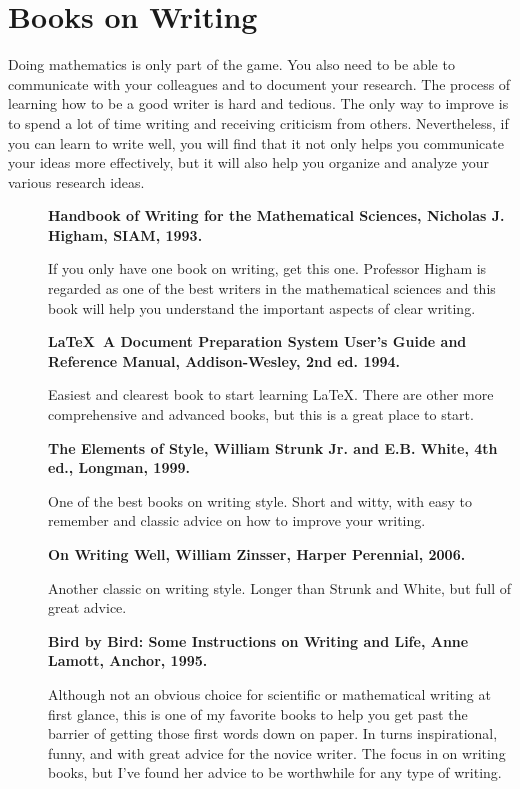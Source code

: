 \documentclass[11pt]{article}
\begin{document}
 
 \section{Books on Writing}
Doing mathematics is only part of the game.  You also need to be able to communicate with your colleagues and to document your research.  The process of learning how to be a good writer is hard and tedious.  The only way to improve is to spend a lot of time writing and receiving criticism from others.  Nevertheless, if you can learn to write well, you will find that it not only helps you communicate your ideas more effectively, but it will also help you organize and analyze your various research ideas. 
  
\begin{description}

\item[ ] {\bf Handbook of Writing for the Mathematical Sciences, Nicholas J. Higham, SIAM, 1993.} 

If you only have one book on writing, get this one. Professor Higham is regarded as one of the best writers in the mathematical sciences and this book will help you understand the important aspects of clear writing.

\item[ ] {\bf \LaTeX  \ A Document Preparation System User's Guide and Reference Manual, Addison-Wesley, 2nd ed. 1994.} 

Easiest and clearest book to start learning \LaTeX.  There are other more comprehensive and advanced books, but this is a great place to start.

\item[] {\bf The Elements of Style, William Strunk Jr. and E.B. White, 4th ed., Longman, 1999.} 

One of the best books on writing style.  Short and witty, with easy to remember and classic advice on how to improve your writing.

\item[] {\bf On Writing Well, William Zinsser, Harper Perennial, 2006.}  

Another classic on writing style.   Longer than Strunk and White, but full of great advice.

\item[] {\bf Bird by Bird: Some Instructions on Writing and Life, Anne Lamott, Anchor, 1995.}  

Although not an obvious choice for scientific or mathematical writing at first glance, this is one of my favorite books to help you get past the barrier of getting those first words down on paper.  In turns inspirational, funny, and with great advice for the novice writer.  The focus in on writing books, but I've found her advice to be worthwhile for any type of writing.

\end{description}
\end{document}
